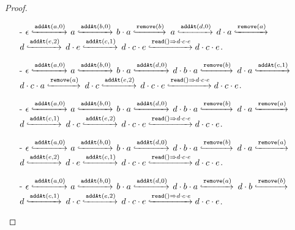 \begin {proof}
\begin{itemize}
\item[-] $\epsilon \specarrow{\alabelshort[\mathtt{addAt}]{a,0}}$ $a \specarrow{\alabelshort[\mathtt{addAt}]{b,0}}$ $b \cdot a \specarrow{\alabelshort[\mathtt{remove}]{b}}$ $a \specarrow{\alabelshort[\mathtt{addAt}]{d,0}}$ $d \cdot a \specarrow{\alabelshort[\mathtt{remove}]{a}}$ $d \specarrow{\alabelshort[\mathtt{addAt}]{e,2}}$ $d \cdot e \specarrow{\alabelshort[\mathtt{addAt}]{c,1}}$ $d \cdot c \cdot e \specarrow{\alabellong[\mathtt{read}]{}{d \cdot c \cdot e}{}} d \cdot c \cdot e$. 

\item[-] $\epsilon \specarrow{\alabelshort[\mathtt{addAt}]{a,0}}$ $a \specarrow{\alabelshort[\mathtt{addAt}]{b,0}}$ $b \cdot a \specarrow{\alabelshort[\mathtt{addAt}]{d,0}}$ $d \cdot b \cdot a \specarrow{\alabelshort[\mathtt{remove}]{b}}$ $d \cdot a \specarrow{\alabelshort[\mathtt{addAt}]{c,1}}$ $d \cdot c \cdot a \specarrow{\alabelshort[\mathtt{remove}]{a}}$ $d \cdot c \specarrow{\alabelshort[\mathtt{addAt}]{e,2}}$ $d \cdot c \cdot e \specarrow{\alabellong[\mathtt{read}]{}{d \cdot c \cdot e}{}} d \cdot c \cdot e$. 

\item[-] $\epsilon \specarrow{\alabelshort[\mathtt{addAt}]{a,0}}$ $a \specarrow{\alabelshort[\mathtt{addAt}]{b,0}}$ $b \cdot a \specarrow{\alabelshort[\mathtt{addAt}]{d,0}}$ $d \cdot b \cdot a \specarrow{\alabelshort[\mathtt{remove}]{b}}$ $d \cdot a \specarrow{\alabelshort[\mathtt{remove}]{a}}$ $d \specarrow{\alabelshort[\mathtt{addAt}]{c,1}}$ $d \cdot c \specarrow{\alabelshort[\mathtt{addAt}]{e,2}}$ $d \cdot c \cdot e \specarrow{\alabellong[\mathtt{read}]{}{d \cdot c \cdot e}{}} d \cdot c \cdot e$. 

\item[-] $\epsilon \specarrow{\alabelshort[\mathtt{addAt}]{a,0}}$ $a \specarrow{\alabelshort[\mathtt{addAt}]{b,0}}$ $b \cdot a \specarrow{\alabelshort[\mathtt{addAt}]{d,0}}$ $d \cdot b \cdot a \specarrow{\alabelshort[\mathtt{remove}]{b}}$ $d \cdot a \specarrow{\alabelshort[\mathtt{remove}]{a}}$ $d \specarrow{\alabelshort[\mathtt{addAt}]{e,2}}$ $d \cdot e \specarrow{\alabelshort[\mathtt{addAt}]{c,1}}$ $d \cdot c \cdot e \specarrow{\alabellong[\mathtt{read}]{}{d \cdot c \cdot e}{}} d \cdot c \cdot e$. 

\item[-] $\epsilon \specarrow{\alabelshort[\mathtt{addAt}]{a,0}}$ $a \specarrow{\alabelshort[\mathtt{addAt}]{b,0}}$ $b \cdot a \specarrow{\alabelshort[\mathtt{addAt}]{d,0}}$ $d \cdot b \cdot a \specarrow{\alabelshort[\mathtt{remove}]{a}}$ $d \cdot b \specarrow{\alabelshort[\mathtt{remove}]{b}}$ $d \specarrow{\alabelshort[\mathtt{addAt}]{c,1}}$ $d \cdot c \specarrow{\alabelshort[\mathtt{addAt}]{e,2}}$ $d \cdot c \cdot e \specarrow{\alabellong[\mathtt{read}]{}{d \cdot c \cdot e}{}} d \cdot c \cdot e$. 


\end{itemize}
\end{proof}
